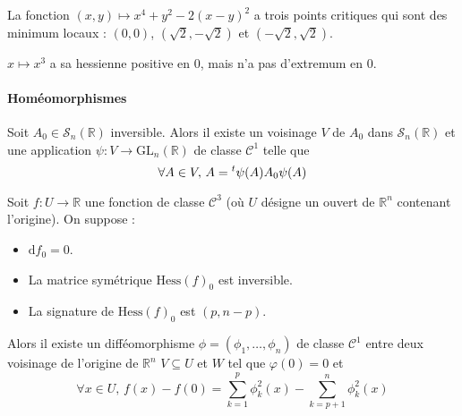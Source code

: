   \begin{example}
    La fonction $(x,y) \mapsto x^4 + y^2 - 2(x-y)^2$ a trois points critiques qui sont des minimum locaux : $(0,0)$, $(\sqrt{2},-\sqrt{2})$ et $(-\sqrt{2},\sqrt{2})$.
  \end{example}

  \begin{cexample}
    $x \mapsto x^3$ a sa hessienne positive en $0$, mais n'a pas d'extremum en $0$.
  \end{cexample}

  \paragraph{Homéomorphismes}


  \begin{lemma}
    Soit $A_0 \in \mathcal{S}_n(\mathbb{R})$ inversible. Alors il existe un voisinage $V$ de $A_0$ dans $\mathcal{S}_n(\mathbb{R})$ et une application $\psi : V \rightarrow \mathrm{GL}_n(\mathbb{R})$ de classe $\mathcal{C}^1$ telle que
    \[ \forall A \in V, \, A = \mathstrut ^t \psi(A) A_0 \psi(A) \]
  \end{lemma}


  \begin{lemma}[Morse]
    Soit $f : U \rightarrow \mathbb{R}$ une fonction de classe $\mathcal{C}^3$ (où $U$ désigne un ouvert de $\mathbb{R}^n$ contenant l'origine). On suppose :
    \begin{itemize}
      \item $\mathrm{d} f_0 = 0$.
      \item La matrice symétrique $\mathrm{Hess} (f)_0$ est inversible.
      \item La signature de $\mathrm{Hess}(f)_0$ est $(p, n-p)$.
    \end{itemize}
    Alors il existe un difféomorphisme $\phi = (\phi_1, \dots, \phi_n)$ de classe $\mathcal{C}^1$ entre deux voisinage de l'origine de $\mathbb{R}^n$ $V \subseteq U$ et $W$ tel que $\varphi(0) = 0$ et
    \[ \forall x \in U, \, f(x) - f(0) = \sum_{k=1}^p \phi_k^2(x) - \sum_{k=p+1}^n \phi_k^2(x) \]
  \end{lemma}



